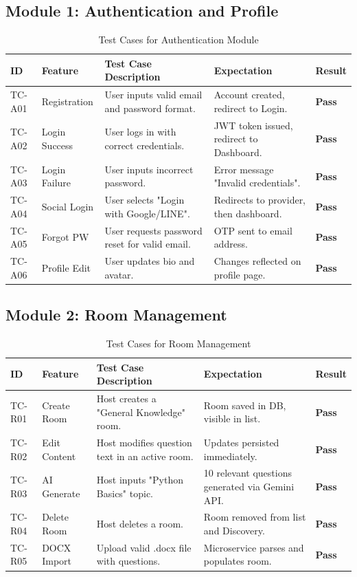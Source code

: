 \subsection{Module 1: Authentication and Profile}
\begin{table}[htbp]
\centering
\caption{Test Cases for Authentication Module}
\begin{tabular}{|l|l|p{4.5cm}|p{4.5cm}|l|}
\hline
\textbf{ID} & \textbf{Feature} & \textbf{Test Case Description} & \textbf{Expectation} & \textbf{Result} \\ \hline
TC-A01 & Registration & User inputs valid email and password format. & Account created, redirect to Login. & \textbf{Pass} \\ \hline
TC-A02 & Login Success & User logs in with correct credentials. & JWT token issued, redirect to Dashboard. & \textbf{Pass} \\ \hline
TC-A03 & Login Failure & User inputs incorrect password. & Error message "Invalid credentials". & \textbf{Pass} \\ \hline
TC-A04 & Social Login & User selects "Login with Google/LINE". & Redirects to provider, then dashboard. & \textbf{Pass} \\ \hline
TC-A05 & Forgot PW & User requests password reset for valid email. & OTP sent to email address. & \textbf{Pass} \\ \hline
TC-A06 & Profile Edit & User updates bio and avatar. & Changes reflected on profile page. & \textbf{Pass} \\ \hline
\end{tabular}
\end{table}
\FloatBarrier

\subsection{Module 2: Room Management}
\begin{table}[htbp]
\centering
\caption{Test Cases for Room Management}
\begin{tabular}{|l|l|p{4.5cm}|p{4.5cm}|l|}
\hline
\textbf{ID} & \textbf{Feature} & \textbf{Test Case Description} & \textbf{Expectation} & \textbf{Result} \\ \hline
TC-R01 & Create Room & Host creates a "General Knowledge" room. & Room saved in DB, visible in list. & \textbf{Pass} \\ \hline
TC-R02 & Edit Content & Host modifies question text in an active room. & Updates persisted immediately. & \textbf{Pass} \\ \hline
TC-R03 & AI Generate & Host inputs "Python Basics" topic. & 10 relevant questions generated via Gemini API. & \textbf{Pass} \\ \hline
TC-R04 & Delete Room & Host deletes a room. & Room removed from list and Discovery. & \textbf{Pass} \\ \hline
TC-R05 & DOCX Import & Upload valid .docx file with questions. & Microservice parses and populates room. & \textbf{Pass} \\ \hline
\end{tabular}
\end{table}
\FloatBarrier
\clearpage

